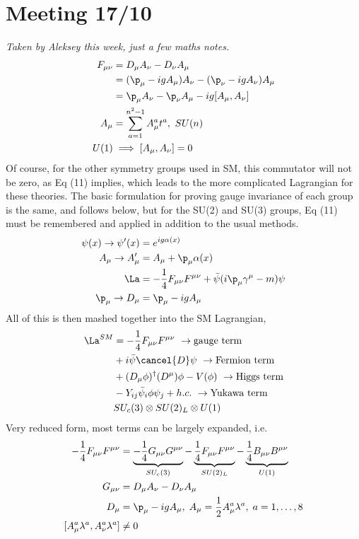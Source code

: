 \documentclass[a4paper, 11pt, normalem]{article}
\begin{document}
\section*{Meeting 17/10}
\textit{Taken by Aleksey this week, just a few maths notes.}
\begin{align}
    F_{\mu\nu} &= D_\mu A_\nu - D_\nu A_\mu \\
               &= (\p_\mu - igA_\mu)A_\nu - (\p_\nu - igA_\nu)A_\mu \\
               &= \p_\mu A_\nu - \p_\nu A_\mu - ig[A_\mu,A_\nu] \\
    A_\mu &= \sum_{a=1}^{n^2-1} A_\mu^at^a,~ SU(n) \\
    U(1) &\implies [A_\mu,A_\nu] = 0 
\end{align}
Of course, for the other symmetry groups used in SM, this commutator will not be zero, as Eq (11) implies, which leads to the more complicated Lagrangian for these theories. 
The basic formulation for proving gauge invariance of each group is the same, and follows below, but for the SU(2) and SU(3) groups, Eq (11) must be remembered and applied in addition to the usual methods. 
\begin{align}
    \psi(x) \to \psi'(x) &= e^{ig\alpha(x)} \\
    A_\mu \to A_\mu' &= A_\mu + \p_\mu\alpha(x) \\
    \La &= -\frac14 F_{\mu\nu}F^{\mu\nu} + \bar{\psi}(i\p_\mu\gamma^\mu - m)\psi \\
    \p_\mu \to D_\mu &= \p_\mu - igA_\mu 
\end{align}
All of this is then mashed together into the SM Lagrangian,
\begin{align}
    \La^{SM} &= -\frac14 F_{\mu\nu}F^{\mu\nu}~ \to \text{gauge term} \\ 
             &+ i\bar{\psi}\cancel{D}\psi ~ \to \text{Fermion term} \\
             &+ (D_\mu\phi)^\dagger(D^\mu)\phi - V(\phi) ~ \to \text{Higgs term} \\
             &- Y_{ij}\bar{\psi}_i\phi\psi_j + h.c. ~ \to \text{Yukawa term} \\
             & SU_c(3)\otimes SU(2)_L\otimes U(1)
\end{align}
Very reduced form, most terms can be largely expanded, i.e.
\begin{align}
    -\frac14 F_{\mu\nu}F^{\mu\nu} &= \underbrace{-\frac14 G_{\mu\nu}G^{\mu\nu}}_{SU_c(3)} - \underbrace{\frac14 F_{\mu\nu}F^{\mu\nu}}_{SU(2)_L} - \underbrace{\frac14 B_{\mu\nu}B^{\mu\nu}}_{U(1)} \\
    G_{\mu\nu} &= D_\mu A_\nu - D_\nu A_\mu \\
    D_\mu &= \p_\mu - igA_\mu,\; A_\mu = \frac12 A_\mu^a\lambda^a,\; a = 1,\dots,8 \\
    [A_\mu^a\lambda^a,A_\nu^a\lambda^a] &\neq 0
\end{align}
\end{document}

